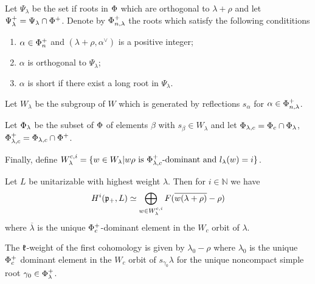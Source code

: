 \begin{definition}\label{def:cohomology_roots}
Let $\Psi_\lambda$ be the set if roots in $\Phi$ which are orthogonal to $\lambda+\rho$ and let $\Psi_\lambda^+ = \Psi_\lambda \cap \Phi^+$. Denote by $\Phi_{n,\lambda}^+$ the roots which satisfy the following condititions
 \begin{enumerate}
    \item $\alpha \in \Phi_n^+$ and $(\lambda+\rho,\alpha^\vee)$ is a positive integer;
    \item $\alpha$ is orthogonal to $\Psi_\lambda$;
    \item $\alpha$ is short if there exist a long root in $\Psi_\lambda$.
 \end{enumerate}
 
 Let $W_\lambda$ be the subgroup of $W$ which is generated by reflections $s_\alpha$ for $\alpha\in \Phi_{n,\lambda}^+$.
 
 Let $\Phi_\lambda$ be the subset of $\Phi$ of elements $\beta$ with $s_\beta\in W_\lambda$ and let $\Phi_{\lambda,c} = \Phi_c \cap \Phi_\lambda$, $\Phi_{\lambda,c}^+ = \Phi_{\lambda,c} \cap \Phi^+$.
 
 Finally, define  $W^{c,i}_\lambda = \{ w \in W_\lambda | w \rho \text{ is } \Phi^+_{\lambda, c}\text{-dominant and } l_\lambda(w)=i \}$.
\end{definition}


\begin{theorem}\label{thm:cohomology}
 Let $L$ be unitarizable with highest weight $\lambda $. Then for $i\in \mathbb{N}$ we have
\[
 H^i(\mathfrak{p}_+,L)\simeq \bigoplus_{w\in W^{c,i}_\lambda} F(\overline{w(\lambda+\rho)} - \rho)
\]
where  $\overline{\lambda}$ is the unique $\Phi_c^+$-dominant element in the $W_c$ orbit of $\lambda$.
\end{theorem}

\begin{remark}
 The $\mathfrak{k}$-weight of the first cohomology is given by $\lambda_0-\rho$ where $\lambda_0$ is the unique $\Phi_c^+$ dominant element in the $W_c$ orbit of $s_{\gamma_0}\lambda$ for the unique noncompact simple root $\gamma_0 \in \Phi_\lambda^+$.
\end{remark}

